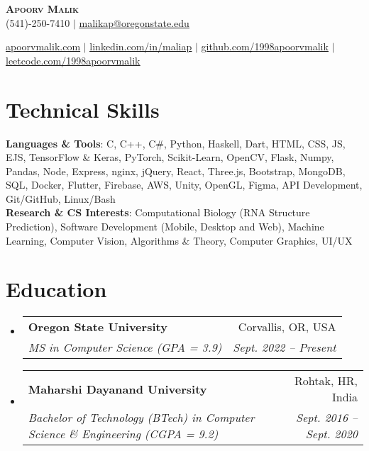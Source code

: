 \documentclass[letterpaper,11pt]{article}
\makeatletter
\newcommand{\resumeSubheading}[4]{
  \vspace{-2pt}\item
    \begin{tabular*}{0.97\textwidth}[t]{l@{\extracolsep{\fill}}r}
      \textbf{#1} & #2 \\
      \textit{\small#3} & \textit{\small #4} \\
    \end{tabular*}\vspace{-7pt}
}
\newcommand{\resumeSubHeadingListStart}{\begin{itemize}[leftmargin=0.15in, label={}]}
\newcommand{\resumeSubHeadingListEnd}{\end{itemize}}
\makeatother
\begin{document}



\begin{center}
    \textbf{\Huge \scshape Apoorv Malik} \\ \vspace{5pt}
    (541)-250-7410 $|$ \href{mailto:malikap@oregonstate.edu}{\underline{malikap@oregonstate.edu}}
\end{center}

\begin{center} 
    \href{http://apoorvmalik.com}{\underline{apoorvmalik.com}} $|$
    \href{https://linkedin.com/in/maliap}{\underline{linkedin.com/in/maliap}} $|$
    \href{https://github.com/1998apoorvmalik}{\underline{github.com/1998apoorvmalik}} $|$
    \href{https://leetcode.com/1998apoorvmalik}{\underline{leetcode.com/1998apoorvmalik}}
\end{center}


\section{Technical Skills}
 \begin{itemize}[leftmargin=0.15in, label={}]
    \small{\item{
     \textbf{Languages \& Tools}{: C, C++, C\#, Python, Haskell, Dart, HTML, CSS, JS, EJS, TensorFlow \& Keras, PyTorch, Scikit-Learn, OpenCV, Flask, Numpy, Pandas, Node, Express, nginx, jQuery, React, Three.js, Bootstrap, MongoDB, SQL, Docker, Flutter, Firebase, AWS, Unity, OpenGL, Figma, API Development, Git/GitHub, Linux/Bash } \\

     \textbf{Research \& CS Interests}{: Computational Biology (RNA Structure Prediction), Software Development (Mobile, Desktop and Web), Machine Learning, Computer Vision, Algorithms \& Theory, Computer Graphics, UI/UX }
    }}
 \end{itemize}

\section{Education}
  \resumeSubHeadingListStart
    \resumeSubheading
      {Oregon State University}{Corvallis, OR, USA}
      {MS in Computer Science (GPA = 3.9)}{Sept. 2022 – Present}
    \resumeSubheading
      {Maharshi Dayanand University}{Rohtak, HR, India}
      {Bachelor of Technology (BTech) in Computer Science \& Engineering (CGPA = 9.2)}{Sept. 2016 – Sept. 2020}
  \resumeSubHeadingListEnd
\end{document}
